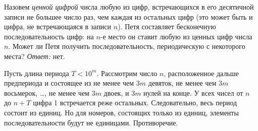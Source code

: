 \problem
Назовем \emph{ценной цифрой} числа любую из цифр, встречающихся в его
десятичной записи не большее число раз, чем каждая из остальных цифр
(это может быть и цифра, не встречающаяся в записи $n$).
Петя составляет бесконечную последовательность цифр: на $n$-е место он ставит
любую из ценных цифр числа $n$.
Может ли Петя получить последовательность, периодическую с некоторого места?
\solution
\emph{Ответ:} нет.
\par
Пусть длина периода $T < 10^m$.
Рассмотрим число $n$, расположенное дальше предпериода и состоящее из не менее
чем $3m$ девяток, не менее чем $3m$ восьмерок, \ldots, не менее чем $3m$ двоек,
и $3m$ нулей на конце.
У всех чисел от $n$ до  $n + T$ цифра 1 встречается реже остальных.
Следовательно, весь период состоит из единиц.
Но для номеров, состоящих только из единиц, элементы последовательности
будут не единицами.
Противоречие.
\endproblem
